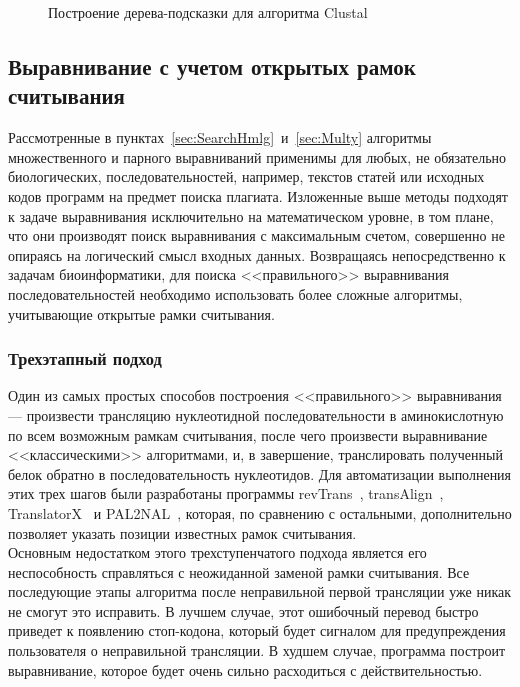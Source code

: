 \begin{figure}[h]
	\caption{Построение дерева-подсказки для алгоритма Clustal}
	\label{ris:Clustal}
\end{figure}

\subsection[Выравнивание с учетом открытых рамок считывания]{\large Выравнивание с учетом открытых рамок считывания}
\hspace{\parindent} Рассмотренные в пунктах~\ref{sec:SearchHmlg}~и~\ref{sec:Multy} алгоритмы множественного и парного выравниваний применимы для любых, не обязательно биологических, последовательностей, например, текстов статей или исходных кодов программ на предмет поиска плагиата. Изложенные выше методы подходят к задаче выравнивания исключительно на математическом уровне, в том плане, что они производят поиск выравнивания с максимальным счетом, совершенно не опираясь на логический смысл входных данных. Возвращаясь непосредственно к задачам биоинформатики, для поиска <<правильного>> выравнивания последовательностей необходимо использовать более сложные алгоритмы, учитывающие открытые рамки считывания.

\subsubsection[Трехэтапный подход]{\large Трехэтапный подход}
\hspace{\parindent} Один из самых простых способов построения <<правильного>> выравнивания --- произвести трансляцию нуклеотидной последовательности в аминокислотную по всем возможным рамкам считывания, после чего произвести выравнивание <<классическими>> алгоритмами, и, в завершение, транслировать полученный белок обратно в последовательность нуклеотидов. Для автоматизации выполнения этих трех шагов были разработаны программы revTrans~\cite{RevTrans}, transAlign~\cite{transAlign}, TranslatorX~\cite{TranslatorX} и PAL2NAL~\cite{PAL2NAL}, которая, по сравнению с остальными, дополнительно позволяет указать позиции известных рамок считывания. \\
\indent Основным недостатком этого трехступенчатого подхода является его неспособность справляться с неожиданной заменой рамки считывания. Все последующие этапы алгоритма после неправильной первой трансляции уже никак не смогут это исправить. В лучшем случае, этот ошибочный перевод быстро приведет к появлению стоп-кодона, который будет сигналом для предупреждения пользователя о неправильной трансляции. В худшем случае, программа построит выравнивание, которое будет очень сильно расходиться с действительностью.

